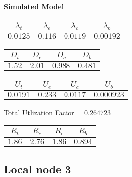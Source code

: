\documentclass{article}
\begin{document}
\begin{minipage}{0.5\textwidth}
\centering	\textbf{Simulated Model}
\begin{table}[H]
\centering
\begin{tabular}{@{}cccc@{}}
\toprule
$\lambda_t$ & $\lambda_e$ & $\lambda_c$ & $\lambda_b$\\
\midrule
$0.0125$ & $0.116$ & $0.0119$ & $0.00192$\\
\bottomrule
\end{tabular}
\end{table}
\begin{table}[H]
\centering
\begin{tabular}{@{}cccc@{}}
\toprule
$D_t$ & $D_e$ & $D_c$ & $D_b$\\
\midrule
$1.52$ & $2.01$ & $0.988$ & $0.481$\\
\bottomrule
\end{tabular}
\end{table}\begin{table}[H]
\centering
\begin{tabular}{@{}cccc@{}}
\toprule
$U_t$ & $U_e$ & $U_c$ & $U_b$\\
\midrule
$0.0191$ & $0.233$ & $0.0117$ & $0.000923$\\
\bottomrule
\end{tabular}
\end{table}
\centering Total Utlization Factor = $0.264723$
\begin{table}[H]
\centering
\begin{tabular}{@{}cccc@{}}
\toprule
$R_t$ & $R_e$ & $R_c$ & $R_b$\\
\midrule
$1.86$ & $2.76$ & $1.86$ & $0.894$\\
\bottomrule
\end{tabular}
\end{table}
\end{minipage}\subsection{Local node 3}
\end{document}
